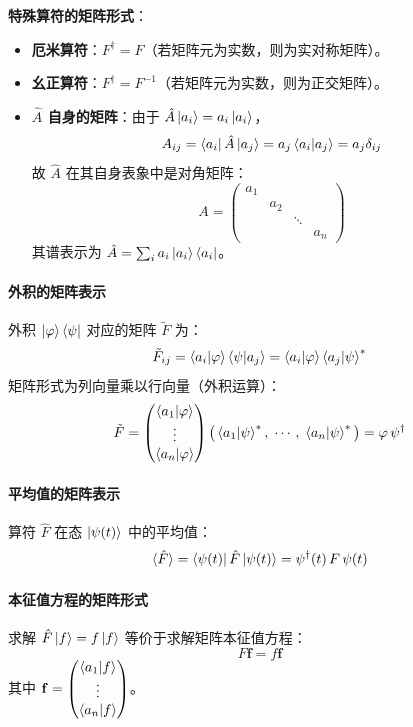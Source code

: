\documentclass[12pt,a4paper]{article}
\begin{document}
\textbf{特殊算符的矩阵形式}：
\begin{itemize}
    \item \textbf{厄米算符}：$F^\dagger=F$（若矩阵元为实数，则为实对称矩阵）。
    \item \textbf{幺正算符}：$F^\dagger=F^{-1}$（若矩阵元为实数，则为正交矩阵）。
    \item \textbf{$\hat{A}$ 自身的矩阵}：由于 $\hat{A}\ket{a_i}=a_i\ket{a_i}$，
    \[
    A_{ij}=\bra{a_i}\hat{A}\ket{a_j}=a_j\braket{a_i|a_j}=a_j\delta_{ij}
    \]
    故 $\hat{A}$ 在其自身表象中是对角矩阵：
    \[
    A=
    \begin{pmatrix}
    a_1 & & & \\
     & a_2 & & \\
     & & \ddots & \\
     & & & a_n
    \end{pmatrix}
    \]
    其谱表示为 $\hat{A}=\sum_i a_i\ket{a_i}\bra{a_i}$。
\end{itemize}

\paragraph{外积的矩阵表示}
外积 $\ket{\varphi}\bra{\psi}$ 对应的矩阵 $\tilde{F}$ 为：
\[
\tilde{F}_{ij}=\braket{a_i|\varphi}\braket{\psi|a_j}=\braket{a_i|\varphi}\braket{a_j|\psi}^*
\]
矩阵形式为列向量乘以行向量（外积运算）：
\[
\tilde{F}=
\begin{pmatrix}
\braket{a_1|\varphi}\\
\vdots\\
\braket{a_n|\varphi}
\end{pmatrix}
\big(\braket{a_1|\psi}^*,\;\cdots,\;\braket{a_n|\psi}^*\big)
=\varphi\,\psi^\dagger
\]

\paragraph{平均值的矩阵表示}
算符 $\hat{F}$ 在态 $\ket{\psi(t)}$ 中的平均值：
\[
\langle\hat{F}\rangle=\bra{\psi(t)}\hat{F}\ket{\psi(t)}=\psi^\dagger(t)\,F\,\psi(t)
\]

\paragraph{本征值方程的矩阵形式}
求解 $\hat{F}\ket{f}=f\ket{f}$ 等价于求解矩阵本征值方程：
\[
F\mathbf{f}=f\mathbf{f}
\]
其中 $\mathbf{f}=\begin{pmatrix}\braket{a_1|f}\\ \vdots\\ \braket{a_n|f}\end{pmatrix}$。
\end{document}
